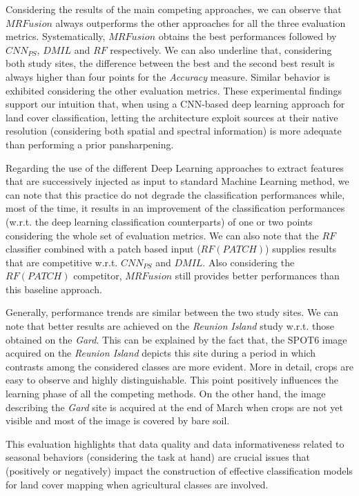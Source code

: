 \documentclass[journal]{IEEEtran}
\newcommand{\method}{$MRFusion$}
\begin{document}
Considering the results of the main competing approaches, we can observe that \method{} always outperforms the other approaches for all the three evaluation metrics. Systematically, \method{} obtains the best performances followed by $CNN_{PS}$, $DMIL$ and $RF$ respectively. We can also underline that, considering both study sites, the difference between the best and the second best result is always higher than four points for the \textit{Accuracy} measure. Similar behavior is exhibited considering the other evaluation metrics.
These experimental findings support our intuition that, when using a CNN-based deep learning approach for land cover classification, letting the architecture exploit sources at their native resolution (considering both spatial and spectral information) is more adequate than performing a prior pansharpening.

Regarding the use of the different Deep Learning approaches to extract features that are successively injected as input to standard Machine Learning method, we can note that this practice do not degrade the classification performances while, most of the time, it results in an improvement of the classification performances (w.r.t. the deep learning classification counterparts) of one or two points considering the whole set of evaluation metrics.
We can also note that the $RF$ classifier combined with a patch based input ($RF(PATCH)$) supplies results that are competitive w.r.t. $CNN_{PS}$ and $DMIL$. Also considering the $RF(PATCH)$ competitor, \method{} still provides better performances than this baseline approach. 

Generally, performance trends are similar between the two study sites. We can note that better results are achieved on the \textit{Reunion Island} study w.r.t. those obtained on the \textit{Gard}. This can be explained by the fact that, the SPOT6 image acquired on the \textit{Reunion Island} depicts this site during a period in which contrasts among the considered classes are more evident. More in detail, crops are easy to observe and highly distinguishable. This point positively influences the learning phase of all the competing methods. On the other hand, the image describing the \textit{Gard} site is acquired at the end of March when crops are not yet visible and most of the image is covered by bare soil. 

This evaluation highlights that data quality and data informativeness related to seasonal behaviors (considering the task at hand) are crucial issues that (positively or negatively) impact the construction of effective classification models for land cover mapping when agricultural classes are involved.
\end{document}
